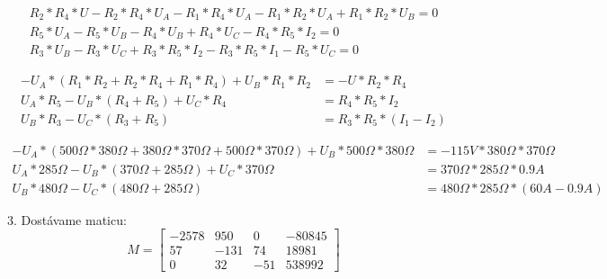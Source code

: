 \documentclass[a4paper,12pt]{article}
\begin{document}
\begin{equation*}
    \begin{split}
	R_2 * R_4 * U - R_2 * R_4 * U_A - R_1 * R_4 * U_A - R_1 * R_2 * U_A + R_1 * R_2 * U_B = 0 \\
	R_5 * U_A - R_5 * U_B - R_4 * U_B + R_4 * U_C - R_4 * R_5 * I_2 = 0 \\
	R_3 * U_B - R_3 * U_C + R_3 * R_5 * I_2 -R_3*R_5*I_1 -R_5*U_C = 0
    \end{split}
\end{equation*}
\hrulefill

\begin{equation*}
    \begin{split}
	-U_A * (R_1*R_2+R_2*R_4 +R_1 * R_4) + U_B *R_1 *R_2 &= -U*R_2* R_4 \\
	U_A * R_5 - U_B * (R_4+R_5) + U_C * R_4 &= R_4 * R_5 * I_2 \\
	U_B * R_3 - U_C * (R_3+R_5)&= R_3* R_5*(I_1-I_2)
    \end{split}
\end{equation*}
\hrulefill

\begin{equation*}
    \begin{split}
	-U_A * (500\Omega*380\Omega+380\Omega*370\Omega +500\Omega * 370\Omega) + U_B *500\Omega *380\Omega &= -115V *380\Omega* 370\Omega \\
	U_A * 285\Omega - U_B * (370\Omega+285\Omega) + U_C * 370\Omega &= 370\Omega * 285\Omega * 0.9A \\
	U_B * 480\Omega - U_C * (480\Omega+285\Omega)&= 480\Omega* 285\Omega*(60A-0.9A)
    \end{split}
\end{equation*}

3. Dostávame maticu:
\begin{equation*}
M = \begin{bmatrix}
	-2578 & 950 & 0 & -80845 \\
	57 & -131 & 74 & 18 981 \\
	0 & 32 & -51 & 538992
     \end{bmatrix}
\end{equation*}
\end{document}

